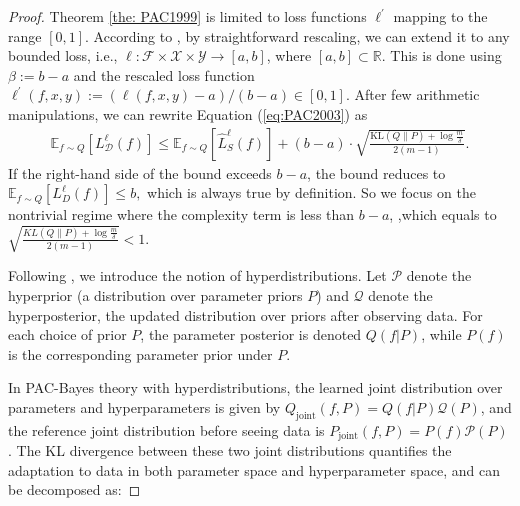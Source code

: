 \documentclass[letterpaper]{article} %
\begin{document}
\begin{proof}
Theorem \ref{the: PAC1999} is limited to loss functions $\ell^{'}$ mapping to the range $[0,1]$. According to \citep{germainPACBayesianTheoryMeets2016}, by straightforward rescaling, we can extend it to any bounded loss, i.e., $\ell: \mathcal{F} \times \mathcal{X} \times \mathcal{Y} \rightarrow[a, b]$, where $[a, b] \subset \mathbb{R}$. This is done using $\beta:=b-a$ and the rescaled loss function $\ell^{\prime}(f, x, y):=(\ell(f, x, y)-a) /(b-a) \in[0,1]$. After few arithmetic manipulations, we can rewrite Equation (\ref{eq:PAC2003}) as
\begin{equation}
\begin{aligned}
        \mathbb{E}_{f \sim Q}[{L}_\mathcal{D}^{\ell}(f)] \leq \mathbb{E}_{f\sim Q}[\widehat{{L}}_S^{\ell}(f)] + (b - a) \cdot \sqrt{\frac{\mathrm{KL}(Q \| P) + \log \frac{m}{\delta}}{2(m - 1)}} .
\end{aligned}
\end{equation}
If the right-hand side of the bound exceeds $b-a$, the bound reduces to
$\mathbb{E}_{f \sim Q}[L_D^{\ell}(f)] \leq b,$
which is always true by definition. So we focus on the nontrivial regime where the complexity term is less than $b-a$, ,which equals to
$\sqrt{\frac{KL(Q\|P)+\log \frac{m}{\delta}}{2(m-1)}} <1. $


Following \citep{pentinaPACBayesianBoundLifelong2014}, we introduce the notion of hyperdistributions. Let $\mathcal{P}$ denote the hyperprior (a distribution over parameter priors $P$) and $\mathcal{Q}$ denote the hyperposterior, the updated distribution over priors after observing data. For each choice of prior $P$, the parameter posterior is denoted $Q(f|P)$, while $P(f)$ is the corresponding parameter prior under $P$.

In PAC-Bayes theory with hyperdistributions, the learned joint distribution over parameters and hyperparameters is given by $Q_\text{joint}(f, P) = Q(f|P)\mathcal{Q}(P)$, and the reference joint distribution before seeing data is $P_\text{joint}(f, P) = P(f)\mathcal{P}(P)$. The KL divergence between these two joint distributions quantifies the adaptation to data in both parameter space and hyperparameter space, and can be decomposed as:


\end{proof}
\end{document}
